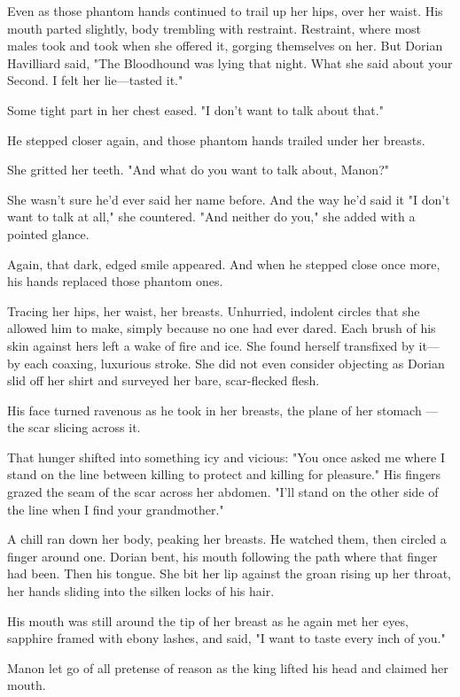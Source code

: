 Even as those phantom hands continued to trail up her hips, over her waist.
His mouth parted slightly, body trembling with restraint.
Restraint, where most males took and took when she offered it, gorging themselves on her.
But Dorian Havilliard said, "The Bloodhound was lying that night.
What she said about your Second.
I felt her lie---tasted it."

Some tight part in her chest eased.
"I don't want to talk about that."

He stepped closer again, and those phantom hands trailed under her breasts.

She gritted her teeth.
"And what do you want to talk about, Manon?"

She wasn't sure he'd ever said her name before.
And the way he'd said it 
"I don't want to talk at all," she countered.
"And neither do you," she added with a pointed glance.

Again, that dark, edged smile appeared.
And when he stepped close once more, his hands replaced those phantom ones.

Tracing her hips, her waist, her breasts.
Unhurried, indolent circles that she allowed him to make, simply because no one had ever dared.
Each brush of his skin against hers left a wake of fire and ice.
She found herself transfixed by it--- by each coaxing, luxurious stroke.
She did not even consider objecting as Dorian slid off her shirt and surveyed her bare, scar-flecked flesh.

His face turned ravenous as he took in her breasts, the plane of her stomach ---the scar slicing across it.

That hunger shifted into something icy and vicious: "You once asked me where I stand on the line between killing to protect and killing for pleasure."
His fingers grazed the seam of the scar across her abdomen.
"I'll stand on the other side of the line when I find your grandmother."

A chill ran down her body, peaking her breasts.
He watched them, then circled a finger around one.
Dorian bent, his mouth following the path where that finger had been.
Then his tongue.
She bit her lip against the groan rising up her throat, her hands sliding into the silken locks of his hair.

His mouth was still around the tip of her breast as he again met her eyes, sapphire framed with ebony lashes, and said, "I want to taste every inch of you."

Manon let go of all pretense of reason as the king lifted his head and claimed her mouth.

